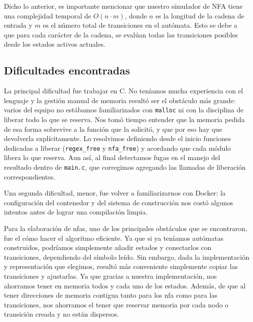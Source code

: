 \documentclass[12pt, letterpaper]{article}
\begin{document}
\noindent Dicho lo anterior, es importante mencionar que nuestro simulador de NFA tiene una complejidad temporal de $O(n \cdot m)$, donde $n$ es la longitud de la cadena de entrada y $m$ es el número total de transiciones en el autómata. Esto se debe a que para cada carácter de la cadena, se evalúan todas las transiciones posibles desde los estados activos actuales.

\subsection*{Dificultades encontradas}
\noindent La principal dificultad fue trabajar en C. No teníamos mucha experiencia con el
lenguaje y la gestión manual de memoria resultó ser el obstáculo más grande:
varios del equipo no estábamos familiarizados con \texttt{malloc} ni con la
disciplina de liberar todo lo que se reserva. Nos tomó tiempo entender que la
memoria pedida de esa forma sobrevive a la función que la solicitó, y que por
eso hay que devolverla explícitamente. Lo resolvimos definiendo desde el inicio
funciones dedicadas a liberar (\texttt{regex\_free} y \texttt{nfa\_free}) y
acordando que cada módulo libera lo que reserva. Aun así, al final detectamos
fugas en el manejo del resultado dentro de \texttt{main.c}, que corregimos
agregando las llamadas de liberación correspondientes.

\noindent Una segunda dificultad, menor, fue volver a familiarizarnos con Docker: la
configuración del contenedor y del sistema de construcción nos costó algunos
intentos antes de lograr una compilación limpia.

\noindent Para la elaboración de nfas, uno de los principales obstáculos que se encontraron, fue el cómo hacer el algoritmo eficiente. Ya que si ya teníamos autómatas construidos, podríamos simplemente añadir estados y conectarlos con transiciones, dependiendo del símbolo leído. Sin embargo, dada la implementación y representación que elegimos, resultó más conveniente simplemente copiar las transiciones y ajustarlas. Ya que gracias a nuestra implementación, nos ahorramos tener en memoria todos y cada uno de los estados. Además, de que al tener direcciones de memoria contigua tanto para los nfa como para las transiciones, nos ahorramos el tener que reservar memoria por cada nodo o transición creada y no están dispersos.
\end{document}
